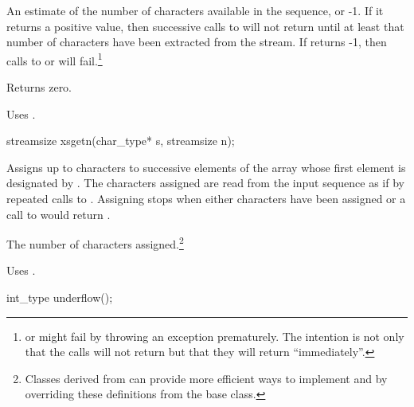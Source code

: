 \begin{itemdescr}
\pnum
\returns
An estimate of the number of
characters available in the sequence, or -1.
If it returns
a positive value, then successive calls to
will not return
until at least that number of characters have been
extracted from the stream.
If
returns -1, then calls to
or
will fail.\footnote{
or
might fail by throwing an exception prematurely.
The intention is not only that the calls will not return
but that they will return ``immediately''.}

\pnum
{}
Returns zero.

\pnum
\remarks
Uses
.
\end{itemdescr}

%
\begin{itemdecl}
streamsize xsgetn(char_type* s, streamsize n);
\end{itemdecl}

\begin{itemdescr}
\pnum
\effects
Assigns up to  characters to successive elements of
the array whose first element is designated by .
The characters assigned are read from the input sequence as if
by repeated calls to
.
Assigning stops when either  characters
have been assigned or a call to
would return
.

\pnum
\returns
The number of characters assigned.\footnote{Classes derived from
can provide more efficient ways to implement
and
by overriding these definitions from the base class.}

\pnum
\remarks
Uses
.
\end{itemdescr}

%
\begin{itemdecl}
int_type underflow();
\end{itemdecl}

